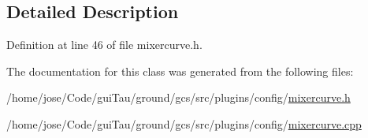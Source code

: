 \subsection{Detailed Description}


Definition at line 46 of file mixercurve.\-h.



The documentation for this class was generated from the following files\-:\begin{DoxyCompactItemize}
\item 
/home/jose/\-Code/gui\-Tau/ground/gcs/src/plugins/config/\hyperlink{mixercurve_8h}{mixercurve.\-h}\item 
/home/jose/\-Code/gui\-Tau/ground/gcs/src/plugins/config/\hyperlink{mixercurve_8cpp}{mixercurve.\-cpp}\end{DoxyCompactItemize}
